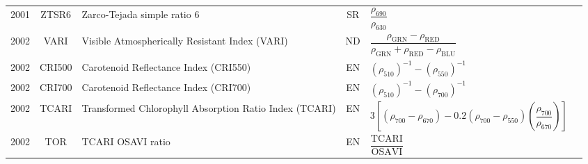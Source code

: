 \documentclass[10pt]{article}
\begin{document}
\begin{ThreePartTable}
\begin{longtable}{c c m{2.3in} c M{2.8in} M{1.5in}}
  2001 & ZTSR6   & Zarco-Tejada simple ratio 6                                                    & SR & $\dfrac{\rho_{690}}{\rho_{630}}$                                                                                                                                                                                                                                                        & \citet{Zarco-Tejada2001a}                           \\
  2002 & VARI    & Visible Atmospherically Resistant Index (VARI)                                 & ND & $\dfrac{\rho_\text{GRN}-\rho_\text{RED}}{\rho_\text{GRN}+\rho_\text{RED}-\rho_\text{BLU}}$                                                                                                                                                                                              & \citet{Gitelson2002b}                               \\
  2002 & CRI500  & Carotenoid Reflectance Index (CRI550)                                          & EN & $(\rho_{510})^{-1}-(\rho_{550})^{-1}$                                                                                                                                                                                                                                                   & \citet{Gitelson2002a}                               \\
  2002 & CRI700  & Carotenoid Reflectance Index (CRI700)                                          & EN & $(\rho_{510})^{-1}-(\rho_{700})^{-1}$                                                                                                                                                                                                                                                   & \citet{Gitelson2002a}                               \\
  2002 & TCARI   & Transformed Chlorophyll Absorption Ratio Index (TCARI)                         & EN & $3\left[(\rho_{700}-\rho_{670})-0.2(\rho_{700}-\rho_{550})\left(\dfrac{\rho_{700}}{\rho_{670}}\right)\right]$                                                                                                                                                                           & \citet{Haboudane2002}                               \\
  2002 & TOR     & TCARI OSAVI ratio                                                              & EN & $\dfrac{\text{TCARI}}{\text{OSAVI}}$                                                                                                                                                                                                                                                    & \citet{Haboudane2002}                               \\

\end{longtable}
\end{ThreePartTable}
\end{document}
